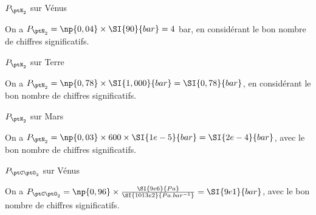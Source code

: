 \begin{enonce}
$P_{\ptN_2}$ sur Vénus
\end{enonce}


\begin{corrige}
On a $P_{\ptN_2}=\np{0,04} \times \SI{90}{bar}=4$ bar, en considérant le bon nombre de chiffres significatifs.
\end{corrige}




\begin{enonce}
$P_{\ptN_2}$ sur Terre
\end{enonce}


\begin{corrige}
On a $P_{\ptN_2}=\np{0,78} \times \SI{1,000}{bar} = \SI{0,78}{bar}$, en considérant le bon nombre de chiffres significatifs.
\end{corrige}



\begin{enonce}
$P_{\ptN_2}$ sur Mars
\end{enonce}


\begin{corrige}
On a $P_{\ptN_2}=\np{0,03} \times 600 \times \SI{1e-5}{bar} = \SI{2e-4}{bar}$, avec le bon nombre de chiffres significatifs.
\end{corrige}



\begin{enonce}
$P_{\ptC\ptO_2}$ sur Vénus
\end{enonce}


\begin{corrige}
On a $P_{\ptC\ptO_2} = \np{0,96} \times \frac{  \SI{9e6}{Pa} }{\SI{1013e2}{Pa.bar^{-1}}}=\SI{9e1}{bar}$, avec le bon nombre de chiffres significatifs.
\end{corrige}

